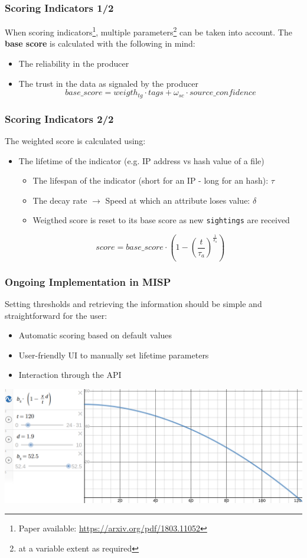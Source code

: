 \begin{frame}
        \frametitle{Scoring Indicators 1/2}
        When scoring indicators\footnote{Paper available: \url{https://arxiv.org/pdf/1803.11052}}, multiple parameters\footnote{at a variable extent as required} can be taken into account. The {\bf base score} is calculated with the following in mind:
    \begin{itemize}
        \item The reliability in the producer
        \item The trust in the data as signaled by the producer
        $$base\_score = weigth_{tg} \cdot tags + \omega_{sc} \cdot source\_confidence$$
    \end{itemize}
\end{frame}

\begin{frame}
        \frametitle{Scoring Indicators 2/2}
        The weighted score is calculated using:
        \begin{itemize}
        \item The lifetime of the indicator (e.g. IP address vs hash value of a file)
            \begin{itemize}
                \item The lifespan of the indicator (short for an IP - long for an hash): $\tau$
                \item The decay rate $\rightarrow$ Speed at which an attribute loses value: $\delta$
                \item Weigthed score is reset to its base score as new \texttt{sightings} are received
            \end{itemize}
            $$score = base\_score \cdot \left( 1 - \left( \frac{t}{\tau_a} \right)^{\frac{1}{\delta_a}} \right) $$
        \end{itemize}
\end{frame}

\begin{frame}
\frametitle{Ongoing Implementation in MISP}
    Setting thresholds and retrieving the information should be simple and straightforward for the user:
    \begin{itemize}
        \item Automatic scoring based on default values
        \item User-friendly UI to manually set lifetime parameters
        \item Interaction through the API
    \end{itemize}
    \begin{center}
        \includegraphics[scale=0.15]{pics/param-ui.png}
    \end{center}
\end{frame}
